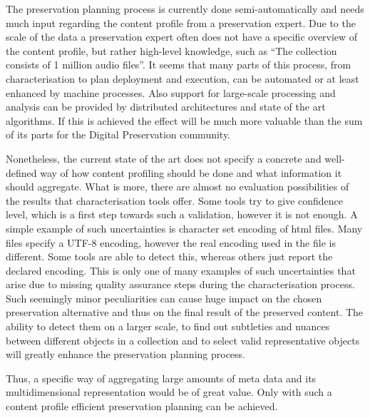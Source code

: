 
The preservation planning process is currently done semi-automatically and needs much input regarding the content profile from a preservation expert. Due to the scale of the data a preservation expert often does not have a specific overview of the content profile, but rather high-level knowledge, such as ``The collection consists of 1 million audio files''. It seems that many parts of this process, from characterisation to plan deployment and execution, can be automated or at least enhanced by machine processes. Also support for large-scale processing and analysis can be provided by distributed architectures and state of the art algorithms. If this is achieved the effect will be much more valuable than the sum of its parts for the Digital Preservation community.

Nonetheless, the current state of the art does not specify a concrete and well-defined way of how content profiling should be done and what information it should aggregate. What is more, there are almost no evaluation possibilities of the results that characterisation tools offer. Some tools try to give confidence level, which is a first step towards such a validation, however it is not enough. A simple example of such uncertainties is character set encoding of html files. Many files specify a UTF-8 encoding, however the real encoding used in the file is different. Some tools are able to detect this, whereas others just report the declared encoding. This is only one of many examples of such uncertainties that arise due to missing quality assurance steps during the characterisation process. Such seemingly minor peculiarities can cause huge impact on the chosen preservation alternative and thus on the final result of the preserved content. The ability to detect them on a larger scale, to find out subtleties and nuances between different objects in a collection and to select valid representative objects will greatly enhance the preservation planning process.

Thus, a specific way of aggregating large amounts of meta data and its multidimensional representation would be of great value. Only with such a content profile efficient preservation planning can be achieved.

